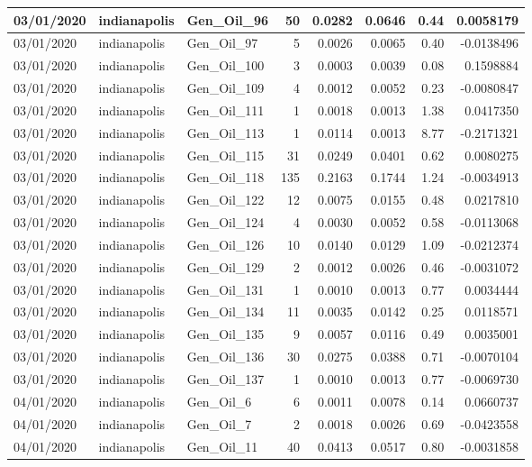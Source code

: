 \documentclass[
  letterpaper,
  DIV=11,
  numbers=noendperiod]{scrartcl}
\begin{document}
\begin{tabular}{l|l|l|r|r|r|r|r}
\hline
03/01/2020 & indianapolis & Gen\_Oil\_96 & 50 & 0.0282 & 0.0646 & 0.44 & 0.0058179\\
\hline
03/01/2020 & indianapolis & Gen\_Oil\_97 & 5 & 0.0026 & 0.0065 & 0.40 & -0.0138496\\
\hline
03/01/2020 & indianapolis & Gen\_Oil\_100 & 3 & 0.0003 & 0.0039 & 0.08 & 0.1598884\\
\hline
03/01/2020 & indianapolis & Gen\_Oil\_109 & 4 & 0.0012 & 0.0052 & 0.23 & -0.0080847\\
\hline
03/01/2020 & indianapolis & Gen\_Oil\_111 & 1 & 0.0018 & 0.0013 & 1.38 & 0.0417350\\
\hline
03/01/2020 & indianapolis & Gen\_Oil\_113 & 1 & 0.0114 & 0.0013 & 8.77 & -0.2171321\\
\hline
03/01/2020 & indianapolis & Gen\_Oil\_115 & 31 & 0.0249 & 0.0401 & 0.62 & 0.0080275\\
\hline
03/01/2020 & indianapolis & Gen\_Oil\_118 & 135 & 0.2163 & 0.1744 & 1.24 & -0.0034913\\
\hline
03/01/2020 & indianapolis & Gen\_Oil\_122 & 12 & 0.0075 & 0.0155 & 0.48 & 0.0217810\\
\hline
03/01/2020 & indianapolis & Gen\_Oil\_124 & 4 & 0.0030 & 0.0052 & 0.58 & -0.0113068\\
\hline
03/01/2020 & indianapolis & Gen\_Oil\_126 & 10 & 0.0140 & 0.0129 & 1.09 & -0.0212374\\
\hline
03/01/2020 & indianapolis & Gen\_Oil\_129 & 2 & 0.0012 & 0.0026 & 0.46 & -0.0031072\\
\hline
03/01/2020 & indianapolis & Gen\_Oil\_131 & 1 & 0.0010 & 0.0013 & 0.77 & 0.0034444\\
\hline
03/01/2020 & indianapolis & Gen\_Oil\_134 & 11 & 0.0035 & 0.0142 & 0.25 & 0.0118571\\
\hline
03/01/2020 & indianapolis & Gen\_Oil\_135 & 9 & 0.0057 & 0.0116 & 0.49 & 0.0035001\\
\hline
03/01/2020 & indianapolis & Gen\_Oil\_136 & 30 & 0.0275 & 0.0388 & 0.71 & -0.0070104\\
\hline
03/01/2020 & indianapolis & Gen\_Oil\_137 & 1 & 0.0010 & 0.0013 & 0.77 & -0.0069730\\
\hline
04/01/2020 & indianapolis & Gen\_Oil\_6 & 6 & 0.0011 & 0.0078 & 0.14 & 0.0660737\\
\hline
04/01/2020 & indianapolis & Gen\_Oil\_7 & 2 & 0.0018 & 0.0026 & 0.69 & -0.0423558\\
\hline
04/01/2020 & indianapolis & Gen\_Oil\_11 & 40 & 0.0413 & 0.0517 & 0.80 & -0.0031858\\

\end{tabular}
\end{document}
